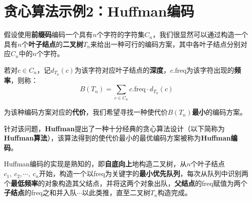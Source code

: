 \documentclass[12pt,a4paper,violet,oneside]{bbe}
\begin{document}
\section{贪心算法示例2：Huffman编码}
\begin{example}
	假设使用\textbf{前缀码}编码一个具有$n$个字符的字符集$C_n$，我们很显然可以通过构造一个具有$n$个\textbf{叶子结点}的\textbf{二叉树}$T_n$来给出一种可行的编码方案，其中各叶子结点分别对应$C_n$中的$n$个字符。
	
	若对$c\in C_n$，记$d_{T_n}(c)$为该字符对应叶子结点的\textbf{深度}，$c.\text{freq}$为该字符出现的\textbf{频率}，则称：
	$$
	B(T_n)=\sum\limits_{c\in C_n}c.\text{freq}\cdot d_{T_n}(c)
	$$
	
	为该种编码方案对应的\textbf{代价}，我们希望寻找一种使代价$B(T_n)$\textbf{最小}的编码方案。
\end{example}

针对该问题，\textbf{Huffman}提出了一种十分经典的贪心算法设计（以下简称为\textbf{Huffman算法}），该算法得到的使代价最小的最优编码方案被称为\textbf{Huffman编码}。

Huffman编码的实现是熟知的，即\textbf{自底向上}地构造二叉树，从$n$个叶子结点$c_1,~c_2,\cdots,~c_n$开始，构造一个以freq为关键字的\textbf{最小优先队列}，每次从队列中识别两个\textbf{最低频率}的对象构造其父结点，并将这两个对象出队，\textbf{父结点}的freq赋值为两个\textbf{子结点}的freq之和并入队$\cdots$以此类推，直至二叉树$T_n$构造完成。
\end{document}
